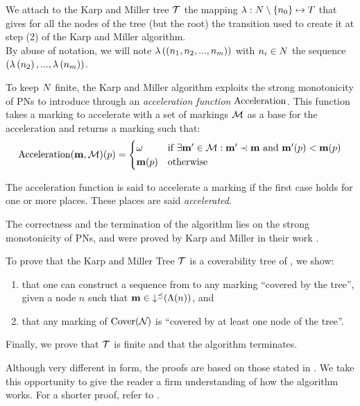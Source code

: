 We attach to the Karp and Miller tree $\mathcal{T}$ the mapping $\operatorname{\lambda} : N \setminus \{n_0\} \mapsto T$ that gives for all the nodes of the tree (but the root) the transition used to create it at step (2) of the Karp and Miller algorithm.\\
By abuse of notation, we will note
$\operatorname{\lambda}\left({(n_1, n_2, ..., n_m)}\right)$
with $n_i \in N$
the sequence
\\
$(\operatorname{\lambda}\left({n_2}\right), ..., \operatorname{\lambda}\left({n_m}\right))$.

To keep $N$ finite, the Karp and Miller algorithm exploits the strong monotonicity of \acp{PN} to introduce \omarks through an \emph{acceleration function} $\operatorname{Acceleration}$.
This function takes a marking \mar to accelerate with a set of markings $\mathcal{M}$ as a base for the acceleration and returns a marking such that:
\[
  \operatorname{Acceleration}(\mathbf{m},\mathcal{M})(p) =
  \begin{cases}
    \omega  &\text{if } \exists \mathbf{m}' \in \mathcal{M} : \mathbf{m}' \prec \mathbf{m} \text{ and } \mathbf{m}'(p) < \mathbf{m}(p) \\
    \mathbf{m}(p) &\text{otherwise}
  \end{cases}
\]

The acceleration function is said to accelerate a marking if the first case holds for one or more places.
These places are said \emph{accelerated}.

The correctness and the termination of the algorithm lies on the strong monotonicity of \acp{PN}, and were proved by Karp and Miller in their work \cite{Karp69}.

To prove that the Karp and Miller Tree $\mathcal{T}$ is a coverability tree of \namePN, we show:
\begin{enumerate}
  \item that one can construct a sequence from \mari to any marking \mar “covered by the tree”, given a node $n$ such that $\mathbf{m} \in \operatorname{\downarrow^\preceq}(\operatorname{\Lambda}(n))$, and
  \item that any marking of $\operatorname{Cover}(\mathcal{N}_{})$ is “covered by at least one node of the tree”.
\end{enumerate}

Finally, we prove that $\mathcal{T}$ is finite and that the algorithm terminates.

Although very different in form, the proofs are based on those stated in \cite{Karp69}.
We take this opportunity to give the reader a firm understanding of how the algorithm works.
For a shorter proof, refer to \cite{Karp69}.

